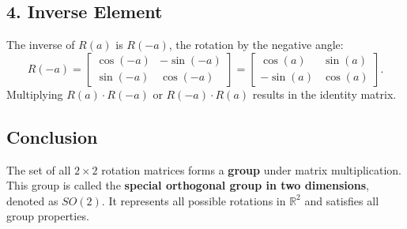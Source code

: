 \documentclass{article}
\begin{document}
\subsection*{4. Inverse Element}
The inverse of \( R(a) \) is \( R(-a) \), the rotation by the negative angle:
\begin{equation}
R(-a) = \begin{bmatrix}
\cos(-a) & -\sin(-a) \\
\sin(-a) & \cos(-a)
\end{bmatrix} = \begin{bmatrix}
\cos(a) & \sin(a) \\
-\sin(a) & \cos(a)
\end{bmatrix}.
\end{equation}
Multiplying \( R(a) \cdot R(-a) \) or \( R(-a) \cdot R(a) \) results in the identity matrix.

\subsection*{Conclusion}
The set of all \( 2 \times 2 \) rotation matrices forms a \textbf{group} under matrix multiplication. This group is called the \textbf{special orthogonal group in two dimensions}, denoted as \( SO(2) \). It represents all possible rotations in \( \mathbb{R}^2 \) and satisfies all group properties.
\end{document}
